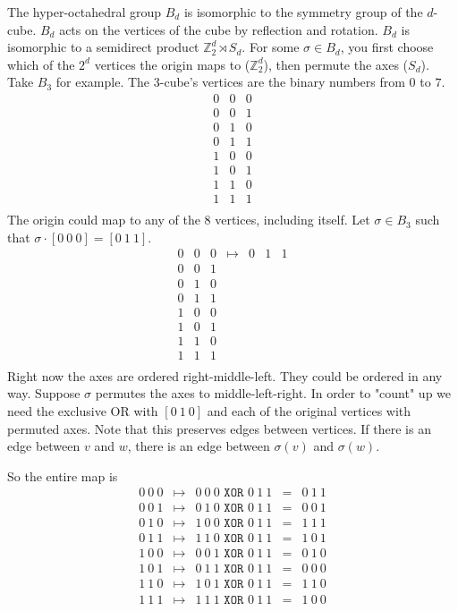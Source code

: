 \documentclass[12pt]{scrippsthesis}
\newcommand{\Z}{\mathbb{Z}}
\theoremstyle{definition}
\theoremstyle{remark}
\theoremstyle{plain}
\begin{document}
The hyper-octahedral group $B_d$ is isomorphic to the symmetry group of the $d$-cube.  $B_d$ acts on the vertices of the cube by reflection and rotation.  $B_d$ is isomorphic to a semidirect product $\Z_{2}^d \rtimes S_d$.  For some $\sigma \in B_d$, you first choose which of the $2^d$ vertices the origin maps to ($\Z_{2}^d$), then permute the axes ($S_d$).  Take $B_3$ for example.  The $3$-cube's vertices are the binary numbers from $0$ to $7$.
$$\begin{array}{ccc}
0&0&0\\
0&0&1\\
0&1&0\\
0&1&1\\
1&0&0\\
1&0&1\\
1&1&0\\
1&1&1\\
\end{array}$$  
The origin could map to any of the $8$ vertices, including itself.  Let $\sigma\in B_3$ such that $\sigma \cdot [0\ 0\ 0] = [0\ 1\ 1]$.
$$\begin{array}{cccccccc}
0&0&0 & \mapsto & 0&1&1  \\
0&0&1\\
0&1&0\\
0&1&1\\
1&0&0\\
1&0&1\\
1&1&0\\
1&1&1\\
\end{array}$$  
Right now the axes are ordered right-middle-left.  They could be ordered in any way.  Suppose $\sigma$ permutes the axes to middle-left-right.  In order to "count" up we need the exclusive OR with $[0\ 1\ 0]$ and each of the original vertices with permuted axes.  Note that this preserves edges between vertices.  If there is an edge between $v$ and $w$, there is an edge between $\sigma (v)$ and $\sigma (w)$.

So the entire map is 
$$\begin{array}{cccccccc}
0\ 0\ 0 & \mapsto & 0\ 0\ 0 \texttt{ XOR } 0\ 1\ 1 &=& 0\ 1\ 1  \\
0\ 0\ 1 & \mapsto & 0\ 1\ 0 \texttt{ XOR } 0\ 1\ 1 &=& 0\ 0\ 1  \\
0\ 1\ 0 & \mapsto & 1\ 0\ 0 \texttt{ XOR } 0\ 1\ 1 &=& 1\ 1\ 1  \\
0\ 1\ 1 & \mapsto & 1\ 1\ 0 \texttt{ XOR } 0\ 1\ 1 &=& 1\ 0\ 1  \\
1\ 0\ 0 & \mapsto & 0\ 0\ 1 \texttt{ XOR } 0\ 1\ 1 &=& 0\ 1\ 0  \\
1\ 0\ 1 & \mapsto & 0\ 1\ 1 \texttt{ XOR } 0\ 1\ 1 &=& 0\ 0\ 0  \\
1\ 1\ 0 & \mapsto & 1\ 0\ 1 \texttt{ XOR } 0\ 1\ 1 &=& 1\ 1\ 0  \\
1\ 1\ 1 & \mapsto & 1\ 1\ 1 \texttt{ XOR } 0\ 1\ 1 &=& 1\ 0\ 0  \\
\end{array}$$ 
\end{document}
